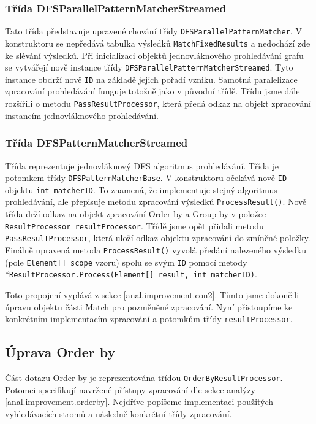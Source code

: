 \subsubsection{Třída DFSParallelPatternMatcherStreamed}

Tato třída představuje upravené chování třídy \texttt{DFSParallelPatternMatcher}.
V konstruktoru se nepředává tabulka výsledků  \texttt{MatchFixedResults} a nedochází zde ke slévání výsledků.
Při inicializaci objektů jednovláknového prohledávání grafu se vytvářejí nově instance třídy \texttt{DFSParallelPatternMatcherStreamed}. 
Tyto instance obdrží nově \texttt{ID} na základě jejich pořadí vzniku.
Samotná paralelizace zpracování prohledávání funguje totožně jako v původní třídě.
Třídu jsme dále rozšířili o metodu \texttt{PassResultProcessor}, která předá odkaz na objekt zpracování instancím jednovláknového prohledávání.

\subsubsection{Třída DFSPatternMatcherStreamed}

Třída reprezentuje jednovláknový DFS algoritmus prohledávání.
Třída je potomkem třídy \texttt{DFSPatternMatcherBase}.
V konstruktoru očekává nově \texttt{ID} objektu \texttt{int matcherID}.
To znamená, že implementuje stejný algoritmus prohledávání, ale přepisuje metodu zpracování výsledků \texttt{ProcessResult()}.
Nově třída drží odkaz na objekt zpracování Order by a Group by v položce \texttt{ResultProcessor resultProcessor}.
Třídě jsme opět přidali metodu \texttt{PassResultProcessor}, která uloží odkaz objektu zpracování do zmíněné položky.
Finálně upravená metoda \texttt{ProcessResult()} vyvolá předání nalezeného výsledku (pole \texttt{Element[] scope} vzoru) spolu se svým \texttt{ID} pomocí metody \\*\texttt{ResultProcessor.Process(Element[] result, int matcherID)}.

Toto propojení vyplává z sekce \ref{anal.improvement.con2}.
Tímto jsme dokončili úpravu objektu části Match pro pozměněné zpracování.
Nyní přistoupíme ke konkrétním implementacím zpracování a potomkům třídy \texttt{resultProcessor}.

\subsection{Úprava Order by}

Část dotazu Order by je reprezentována třídou \texttt{OrderByResultProcessor}.
Potomci specifikují navržené přístupy zpracování dle sekce analýzy \ref{anal.improvement.orderby}.
Nejdříve popíšeme implementaci použitých vyhledávacích stromů a následně konkrétní třídy zpracování.

